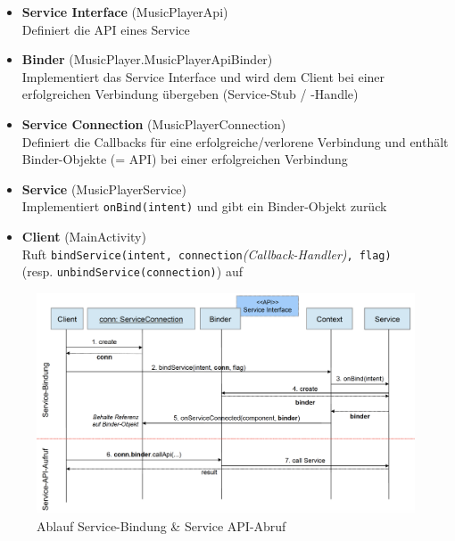\documentclass[a4paper]{article}
\begin{document}
		\begin{itemize}
			
			\item \textbf{Service Interface} (MusicPlayerApi)\\
			Definiert die API eines Service
			
			\item \textbf{Binder} (MusicPlayer.MusicPlayerApiBinder)\\
			Implementiert das Service Interface und wird dem Client bei einer erfolgreichen Verbindung übergeben (Service-Stub / -Handle)
			
			\item \textbf{Service Connection} (MusicPlayerConnection)\\
			Definiert die Callbacks für eine erfolgreiche/verlorene Verbindung und enthält Binder-Objekte (= API) bei einer erfolgreichen Verbindung
			
			\item \textbf{Service} (MusicPlayerService)\\
			Implementiert \texttt{onBind(intent)} und gibt ein Binder-Objekt zurück
			
			\item \textbf{Client} (MainActivity)\\
			Ruft \texttt{bindService(intent, connection}\textit{(Callback-Handler)}\texttt{, flag)} \\
			(resp. \texttt{unbindService(connection)}) auf
			
			
		\end{itemize}
	
		\begin{figure}[!htb]
			\centering
			\includegraphics[width=\textwidth]{img/binding_service_ablauf.png}
			\caption{Ablauf Service-Bindung \& Service API-Abruf}
			\label{fig:bound_service_ablauf}
		\end{figure}
	
\end{document}
